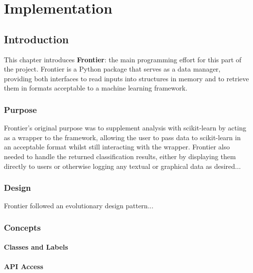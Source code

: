 \chapter{Implementation}
\ifpdf
    \graphicspath{{Chapter3/Figs/Raster/}{Chapter3/Figs/PDF/}{Chapter3/Figs/}}
\else
    \graphicspath{{Chapter3/Figs/Vector/}{Chapter3/Figs/}}
\fi

\section{Introduction}

This chapter introduces \textbf{Frontier}: the main programming effort for this
part of the project. Frontier is a Python package that serves as a data manager,
providing both interfaces to read inputs into structures in memory and to
retrieve them in formats acceptable to a machine learning framework.

\subsection{Purpose}
Frontier's original purpose was to supplement analysis with scikit-learn by
acting as a wrapper to the framework, allowing the user to pass data to
scikit-learn in an acceptable format whilst still interacting with the wrapper.
Frontier also needed to handle the returned classification results, either by
displaying them directly to users or otherwise logging any textual or graphical
data as desired...

\subsection{Design}
Frontier followed an evolutionary design pattern...

\subsection{Concepts}

\subsubsection{Classes and Labels}

\subsubsection{API Access}

